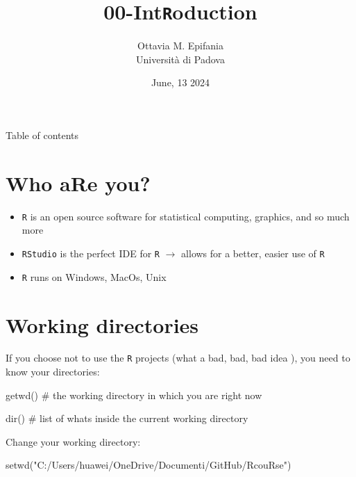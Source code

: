 \documentclass[
  ignorenonframetext,
]{beamer}
\title{00-Int\texttt{R}oduction}
\author{Ottavia M. Epifania\\
Università di Padova}
\date{June, 13 2024}
\institute{Lezione di Dottorato @Università Cattolica del Sacro Cuore
(MI)}
\newenvironment{Shaded}{\begin{snugshade}}{\end{snugshade}}
\newcommand{\CommentTok}[1]{\textcolor[rgb]{0.54,0.53,0.53}{#1}}
\newcommand{\FunctionTok}[1]{\textcolor[rgb]{0.39,0.29,0.61}{#1}}
\newcommand{\NormalTok}[1]{\textcolor[rgb]{0.12,0.11,0.11}{#1}}
\newcommand{\StringTok}[1]{\textcolor[rgb]{0.75,0.01,0.01}{#1}}
\begin{document}
\frame{\titlepage}

\begin{frame}{Table of contents}
\protect\hypertarget{table-of-contents}{}
\tableofcontents
\end{frame}

\hypertarget{who-are-you}{%
\section{Who aRe you?}\label{who-are-you}}

\begin{frame}[fragile]{}
\protect\hypertarget{section}{}
\begin{itemize}
\item
  \texttt{R} is an open source software for statistical computing,
  graphics, and so much more
\item
  \texttt{RStudio} is the perfect IDE for \texttt{R} \(\rightarrow\)
  allows for a better, easier use of \texttt{R}
\item
  \texttt{R} runs on Windows, MacOs, Unix
\end{itemize}
\end{frame}

\hypertarget{working-directories}{%
\section{Working directories}\label{working-directories}}

\begin{frame}[fragile]{}
\protect\hypertarget{section-1}{}
If you choose not to use the \texttt{R} projects (\small what a bad,
bad, bad idea \normalsize), you need to know your directories:

\begin{Shaded}
\begin{Highlighting}[]
\FunctionTok{getwd}\NormalTok{() }\CommentTok{\# the working directory in which you are right now}

\FunctionTok{dir}\NormalTok{() }\CommentTok{\# list of what\textquotesingle{}s inside the current working directory }
\end{Highlighting}
\end{Shaded}

Change your working directory:

\begin{Shaded}
\begin{Highlighting}[]
\FunctionTok{setwd}\NormalTok{(}\StringTok{"C:/Users/huawei/OneDrive/Documenti/GitHub/RcouRse"}\NormalTok{)}
\end{Highlighting}
\end{Shaded}
\end{frame}
\end{document}
